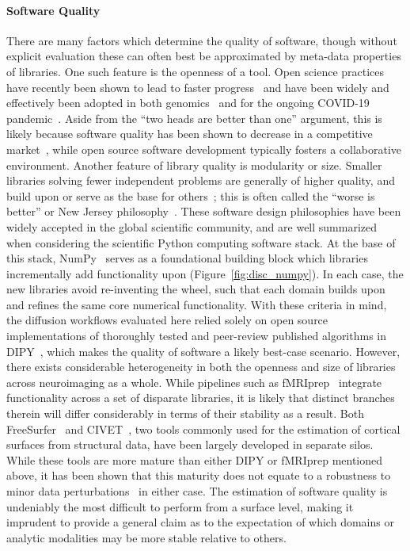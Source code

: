 \paragraph*{Software Quality}
There are many factors which determine the quality of software, though without explicit evaluation these can often
best be approximated by meta-data properties of libraries. One such feature is the openness of a tool. Open science
practices have recently been shown to lead to faster progress~\cite{munafo2017manifesto} and have been widely and
effectively been adopted in both genomics~\cite{goecks2010galaxy} and for the ongoing COVID-19
pandemic~\cite{besanccon2020open}. Aside from the ``two heads are better than one'' argument, this is likely
because software quality has been shown to decrease in a competitive market~\cite{raghunathan2005open}, while open
source software development typically fosters a collaborative environment. Another feature of library quality is
modularity or size. Smaller libraries solving fewer independent problems are generally of higher
quality, and build upon or serve as the base for others~\cite{raghunathan2005open}; this is often called the ``worse
is better'' or New Jersey philosophy~\cite{gabriel1990worse}. These software design philosophies have been widely
accepted in the global scientific community, and are well summarized when considering the scientific Python computing
software stack. At the base of this stack, NumPy~\cite{harris2020array} serves as a foundational building block which
libraries incrementally add functionality upon (Figure~\ref{fig:disc_numpy}). In each case, the new libraries avoid
re-inventing the wheel, such that each domain builds upon and refines the same core numerical functionality. With
these criteria in mind, the diffusion workflows evaluated here relied solely on open source implementations of
thoroughly tested and peer-review published algorithms in DIPY~\cite{Garyfallidis2014-ql,Garyfallidis2012-gg}, which
makes the quality of software a likely best-case scenario. However, there exists considerable heterogeneity in both
the openness and size of libraries across neuroimaging as a whole. While pipelines such as
fMRIprep~\cite{esteban2019fmriprep} integrate functionality across a set of disparate libraries, it is likely that
distinct branches therein will differ considerably in terms of their stability as a result. Both
FreeSurfer~\cite{fischl2012freesurfer} and CIVET~\cite{lepage2017human}, two tools commonly used for the estimation of
cortical surfaces from structural data, have been largely developed in separate silos. While these tools are more
mature than either DIPY or fMRIprep mentioned above, it has been shown that this maturity does not equate to a
robustness to minor data perturbations~\cite{Lewis2017-ll} in either case. The estimation of software quality is
undeniably the most difficult to perform from a surface level, making it imprudent to provide a general claim as to the
expectation of which domains or analytic modalities may be more stable relative to others.

